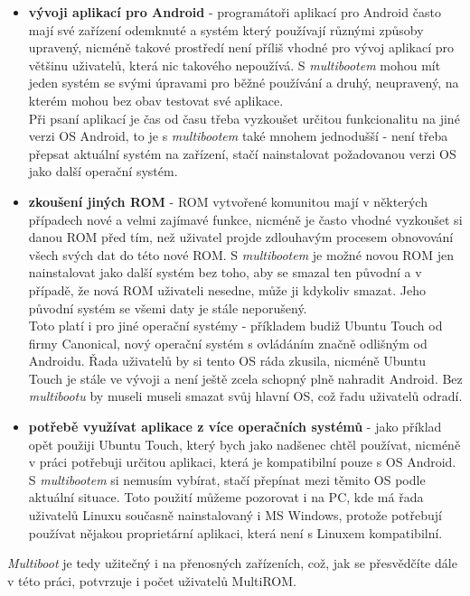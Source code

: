 \documentclass[12pt, a4paper, oneside]{article}
\newcommand{\B}{\textbf} %
\newcommand{\It}{\textit}  %
\begin{document}
\begin{itemize}
    \item \B{vývoji aplikací pro Android} - programátoři aplikací pro Android často mají své zařízení odemknuté a systém který používají různými způsoby upravený, nicméně takové prostředí není příliš vhodné pro vývoj aplikací pro většinu uživatelů, která nic takového nepoužívá. S \It{multibootem} mohou mít jeden systém se svými úpravami pro běžné používání a druhý, neupravený, na kterém mohou bez obav testovat své aplikace. \\
    Při psaní aplikací je čas od času třeba vyzkoušet určitou funkcionalitu na jiné verzi OS Android, to je s \It{multibootem} také mnohem jednodušší - není třeba přepsat aktuální systém na zařízení, stačí nainstalovat požadovanou verzi OS jako další operační systém.

    \item \B{zkoušení jiných ROM} - ROM vytvořené komunitou mají v některých případech nové a velmi zajímavé funkce, nicméně je často vhodné vyzkoušet si danou ROM před tím, než uživatel projde zdlouhavým procesem obnovování všech svých dat do této nové ROM. S \It{multibootem} je možné novou ROM jen nainstalovat jako další systém bez toho, aby se smazal ten původní a v případě, že nová ROM uživateli nesedne, může ji kdykoliv smazat. Jeho původní systém se všemi daty je stále neporušený.\\
    Toto platí i pro jiné operační systémy - příkladem budiž Ubuntu Touch od firmy Canonical, nový operační systém s ovládáním značně odlišným od Androidu. Řada uživatelů by si tento OS ráda zkusila, nicméně Ubuntu Touch je stále ve vývoji a není ještě zcela schopný plně nahradit Android. Bez \It{multibootu} by museli museli smazat svůj hlavní OS, což řadu uživatelů odradí.

    \item \B{potřebě využívat aplikace z více operačních systémů} - jako příklad opět použiji Ubuntu Touch, který bych jako nadšenec chtěl používat, nicméně v práci potřebuji určitou aplikaci, která je kompatibilní pouze s OS Android. S \It{multibootem} si nemusím vybírat, stačí přepínat mezi těmito OS podle aktuální situace. Toto použití můžeme pozorovat i na PC, kde má řada uživatelů Linuxu současně nainstalovaný i MS Windows, protože potřebují používat nějakou proprietární aplikaci, která není s Linuxem kompatibilní.
\end{itemize}

\noindent \It{Multiboot} je tedy užitečný i na přenosných zařízeních, což, jak se přesvědčíte dále v této práci, potvrzuje i počet uživatelů MultiROM.
\end{document}
